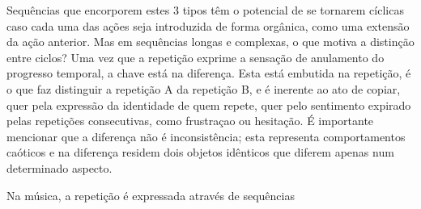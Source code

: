 \documentclass[../main.tex]{subfiles}
\begin{document}
Sequências que encorporem estes 3 tipos têm o potencial de se tornarem cíclicas caso cada uma das ações seja introduzida de forma orgânica, como uma extensão da ação anterior. Mas em sequências longas e complexas, o que motiva a distinção entre ciclos? Uma vez que a repetição exprime a sensação de anulamento do progresso temporal, a chave está na diferença. Esta está embutida na repetição, é o que faz distinguir a repetição A da repetição B, e é inerente ao ato de copiar, quer pela expressão da identidade de quem repete, quer pelo sentimento expirado pelas repetições consecutivas, como frustraçao ou hesitação. É importante mencionar que a diferença não é inconsistência; esta representa comportamentos caóticos e na diferença residem dois objetos idênticos que diferem apenas num determinado aspecto.

Na música, a repetição é expressada através de sequências 











\end{document}
